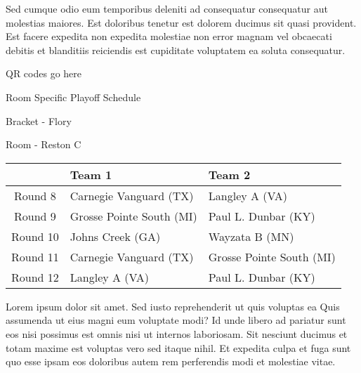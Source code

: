 \documentclass{article}%
\begin{document}
\newline%
Sed cumque odio eum temporibus deleniti ad consequatur consequatur aut molestias maiores. Est doloribus tenetur est dolorem ducimus sit quasi provident. Est facere expedita non expedita molestiae non error magnam vel obcaecati debitis et blanditiis reiciendis est cupiditate voluptatem ea soluta consequatur.%
\vspace*{140pt}%
\begin{center}%
\begin{Huge}%
QR codes go here%
\end{Huge}%
\end{center}%
\newpage%
\begin{center}%
\begin{Huge}%
Room Specific Playoff Schedule%
\end{Huge}%
\vspace*{8pt}%
\linebreak%
\begin{Large}%
Bracket {-} Flory%
\end{Large}%
\vspace*{8pt}%
\linebreak%
\vspace*{8pt}%
\begin{Large}%
Room {-} Reston C%
\end{Large}%
\end{center}%
%
\begin{tabularx}{\textwidth}{|c|Y|Y|}%
\hline%
&Team 1&Team 2\\%
\hline%
Round 8&Carnegie Vanguard (TX)&Langley A (VA)\\%
Round 9&Grosse Pointe South (MI)&Paul L. Dunbar (KY)\\%
Round 10&Johns Creek (GA)&Wayzata B (MN)\\%
Round 11&Carnegie Vanguard (TX)&Grosse Pointe South (MI)\\%
Round 12&Langley A (VA)&Paul L. Dunbar (KY)\\%
\hline%
\end{tabularx}%
\vspace*{8pt}%
\newline%
Lorem ipsum dolor sit amet. Sed iusto reprehenderit ut quis voluptas ea Quis assumenda ut eius magni eum voluptate modi? Id unde libero ad pariatur sunt eos nisi possimus est omnis nisi ut internos laboriosam. Sit nesciunt ducimus et totam maxime est voluptas vero sed itaque nihil. Et expedita culpa et fuga sunt quo esse ipsam eos doloribus autem rem perferendis modi et molestiae vitae.\newline%
\end{document}
